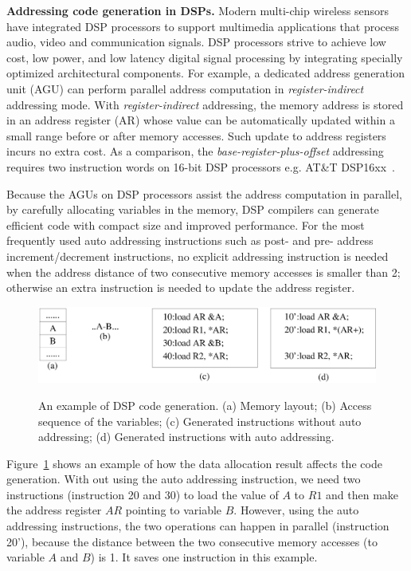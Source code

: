 \textbf{Addressing code generation in DSPs.}
Modern multi-chip wireless sensors have integrated DSP processors to support multimedia applications that process audio, video and communication signals. DSP processors strive to achieve low cost, low power, and low latency digital signal processing by integrating specially optimized architectural components. For example, a dedicated address generation unit (AGU) can perform parallel address computation in {\em register-indirect} addressing mode. With {\em register-indirect} addressing, the memory address is stored in an address register (AR) whose value can be automatically updated within a small range before or after memory accesses. Such update to address registers incurs no extra cost. As a comparison, the {\em base-register-plus-offset} addressing requires two instruction words on 16-bit DSP processors e.g. AT\&T DSP16xx~\cite{related:dsp}. 


Because the AGUs on DSP processors assist the address computation in parallel, by carefully allocating variables in the memory, DSP compilers can generate efficient code with compact size and improved performance.
For the most frequently used auto addressing instructions such as post- and pre- address increment/decrement instructions, no explicit addressing instruction is needed when the address distance of two consecutive memory accesses is smaller than 2; otherwise an extra instruction is needed to update the address register.

\begin{figure}[htbp]
	\centering
		\includegraphics[scale=0.5]{figures/agu.eps}
	\label{fig:agu}
	\caption[An example of DSP code generation.]{An example of DSP code generation.
	(a) Memory layout; (b) Access sequence of the variables; (c) Generated instructions without auto addressing;
	(d) Generated instructions with auto addressing. }
\end{figure}

Figure~\ref{fig:agu} shows an example of how the data allocation result affects the code generation.
With out using the auto addressing instruction, we need two instructions (instruction 20 and 30) to load the value of $A$ to $R1$ and then 
make the address register $AR$ pointing to variable $B$.
However, using the auto addressing instructions, the two operations can happen in parallel (instruction 20'), because the distance between the two consecutive memory accesses (to variable $A$ and $B$) is 1.
It saves one instruction in this example.

